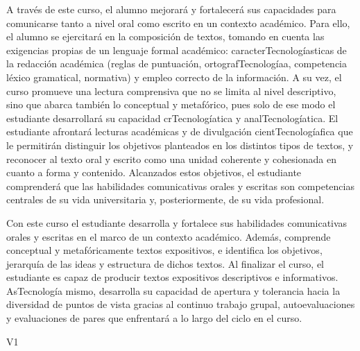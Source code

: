 \begin{syllabus}


\begin{justification}
A través de este curso, el alumno mejorará y fortalecerá sus capacidades para comunicarse tanto a nivel oral como escrito en un contexto académico. Para ello, el alumno se ejercitará en la composición de textos, tomando en cuenta las exigencias propias de un lenguaje formal académico: caracterTecnologíasticas de la redacción académica (reglas de puntuación, ortografTecnologíaa, competencia léxico gramatical, normativa) y empleo correcto de la información. A su vez, el curso promueve una lectura comprensiva que no se limita al nivel descriptivo, sino que abarca también lo conceptual y metafórico, pues solo de ese modo el estudiante desarrollará su capacidad crTecnologíatica y analTecnologíatica. El estudiante afrontará lecturas académicas y de divulgación cientTecnologíafica que le permitirán distinguir los objetivos planteados en los distintos tipos de textos, y reconocer al texto oral y escrito como una unidad coherente y cohesionada en cuanto a forma y contenido. Alcanzados estos objetivos, el estudiante comprenderá que las habilidades comunicativas orales y escritas son competencias centrales de su vida universitaria y, posteriormente, de su vida profesional. 
\end{justification}

\begin{goals}
\item Con este curso el estudiante desarrolla y fortalece sus habilidades comunicativas orales y escritas en el marco de un contexto académico. Además, comprende conceptual y metafóricamente textos expositivos, e identifica los objetivos, jerarquía de las ideas y estructura de dichos textos. Al finalizar el curso, el estudiante es capaz de producir textos expositivos descriptivos e informativos. AsTecnología mismo, desarrolla su capacidad de apertura y tolerancia hacia la diversidad de puntos de vista gracias al continuo trabajo grupal, autoevaluaciones y evaluaciones de pares que enfrentará a lo largo del ciclo en el curso. 
\end{goals}

\begin{outcomes}{V1}
     \item {}
     \item {}
     \item {}
     \item {}
\end{outcomes}


\end{syllabus}
